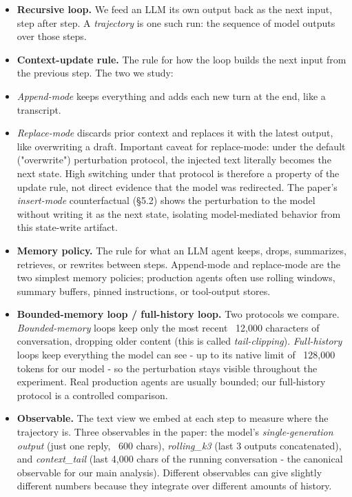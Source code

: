 \documentclass{article}
\theoremstyle{plain}
\theoremstyle{definition}
\begin{document}
\begin{itemize}
  \item \textbf{Recursive loop.} We feed an LLM its own output back as the next
  input, step after step. A \textit{trajectory} is one such run: the
  sequence of model outputs over those steps.
  \item \textbf{Context-update rule.} The rule for how the loop builds the
  next input from the previous step. The two we study:
  \item \textit{Append-mode} keeps everything and adds each new turn at the
    end, like a transcript.
  \item \textit{Replace-mode} discards prior context and replaces it with the
    latest output, like overwriting a draft.
  Important caveat for replace-mode: under the default ("overwrite")
  perturbation protocol, the injected text literally becomes the
  next state. High switching under that protocol is therefore a
  property of the update rule, not direct evidence that the model
  was redirected. The paper's \textit{insert-mode} counterfactual (§5.2)
  shows the perturbation to the model without writing it as the
  next state, isolating model-mediated behavior from this
  state-write artifact.
  \item \textbf{Memory policy.} The rule for what an LLM agent keeps, drops,
  summarizes, retrieves, or rewrites between steps. Append-mode
  and replace-mode are the two simplest memory policies; production
  agents often use rolling windows, summary buffers, pinned
  instructions, or tool-output stores.
  \item \textbf{Bounded-memory loop / full-history loop.} Two protocols we
  compare. \textit{Bounded-memory} loops keep only the most recent
  ~12,000 characters of conversation, dropping older content (this
  is called \textit{tail-clipping}). \textit{Full-history} loops keep everything
  the model can see - up to its native limit of ~128,000 tokens
  for our model - so the perturbation stays visible throughout the
  experiment. Real production agents are usually bounded; our
  full-history protocol is a controlled comparison.
  \item \textbf{Observable.} The text view we embed at each step to measure
  where the trajectory is. Three observables in the paper: the
  model's \textit{single-generation output} (just one reply, ~600 chars),
  \textit{rolling\_k3} (last 3 outputs concatenated), and \textit{context\_tail}
  (last 4,000 chars of the running conversation - the canonical
  observable for our main analysis). Different observables can give
  slightly different numbers because they integrate over different
  amounts of history.
\end{itemize}
\end{document}
